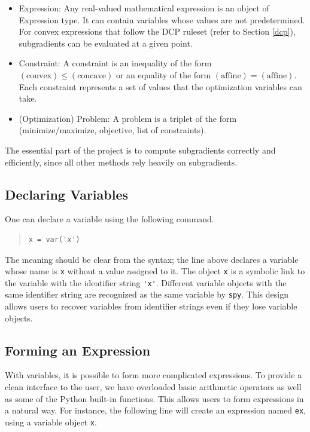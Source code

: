 \documentclass[12pt]{article}
\begin{document}
\begin{itemize}
\item Expression: Any real-valued mathematical expression is an object
of Expression type. It can contain variables whose values are not
predetermined. For convex expressions that follow the DCP ruleset (refer to Section \ref{dcp}), subgradients can be evaluated at a given point.
\item Constraint: A constraint is an inequality of the form
$(\mbox{convex}) \le (\mbox{concave})$ or an equality of the form
$(\mbox{affine}) = (\mbox{affine})$. Each constraint represents a set of values that the optimization variables can take.
\item (Optimization) Problem: A problem is a triplet of the form (minimize/maximize, objective, list of constraints).
\end{itemize}

\noindent The essential part of the project is to compute subgradients correctly
and efficiently, since all other methods rely heavily on subgradients.

\subsection{Declaring Variables}
One can declare a variable using the following command.

\begin{quote}
\begin{verbatim}
x = var('x')
\end{verbatim}
\end{quote}

\noindent The meaning should be clear from the syntax; the line above declares a
variable whose name is \verb'x' without a value assigned to it. The object \verb'x' is a symbolic link to the variable with the identifier string \verb,'x',. Different variable objects with the same identifier string are recognized as the same variable by \verb'spy'. This design allows users to recover variables from identifier strings even if they lose variable objects.

\subsection{Forming an Expression}
With variables, it is possible to form more complicated expressions. To
provide a clean interface to the user, we have overloaded basic arithmetic operators as
well as some of the Python built-in functions. This allows users to form
expressions in a natural way. For instance, the following line will create an expression named \verb'ex', using a variable object \verb'x'.
\end{document}

